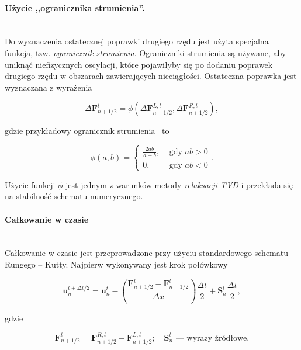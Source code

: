 \paragraph{Użycie ,,ogranicznika strumienia''.}~\\
Do wyznaczenia ostatecznej poprawki drugiego rzędu jest użyta specjalna funkcja,
tzw. \emph{ogranicznik strumienia}. Ograniczniki strumienia są używane, aby
uniknąć niefizycznych oscylacji, które pojawiłyby się po dodaniu poprawek
drugiego rzędu w obszarach zawierających nieciągłości.  Ostateczna poprawka jest
wyznaczana z wyrażenia

\begin{equation}
   \Delta \mathbf{F}^{t}_{n+1/2} = \phi\left(\Delta
   \mathbf{F}^{L,t}_{n+1/2},\Delta \mathbf{F}^{R,t}_{n+1/2} \right),
\end{equation}

gdzie przykładowy ogranicznik strumienia~\cite{leer} to

\begin{equation}
   \phi(a,b) = 
   \begin{cases}
      \frac{2ab}{a+b}, & \textrm{ gdy }ab>0 \\
      0, & \textrm{ gdy }ab<0
   \end{cases}.
\end{equation}

Użycie funkcji $\phi$ jest jednym z warunków metody \emph{relaksacji TVD} i
przekłada się na stabilność schematu numerycznego.

\paragraph{Całkowanie w czasie}~\\

Całkowanie w czasie jest przeprowadzone przy użyciu standardowego schematu
Rungego -- Kutty. Najpierw wykonywany jest krok połówkowy

\begin{equation}
   \mathbf{u}^{t+\Delta t/2}_{n} = \mathbf{u}^{t}_{n} -
   \left(\frac{\mathbf{F}^t_{n+1/2} - \mathbf{F}^t_{n-1/2}}{\Delta x}
   \right)\frac{\Delta t}{2} + \mathbf{S}_n^t \frac{\Delta t}{2},
\end{equation}

gdzie

\begin{equation}
   \mathbf{F}^{t}_{n+1/2} = \mathbf{F}^{R,t}_{n+1/2} -
   \mathbf{F}^{L,t}_{n+1/2};\quad \mathbf{S}_n^t\textrm{ --- wyrazy źródłowe}.
\end{equation}

